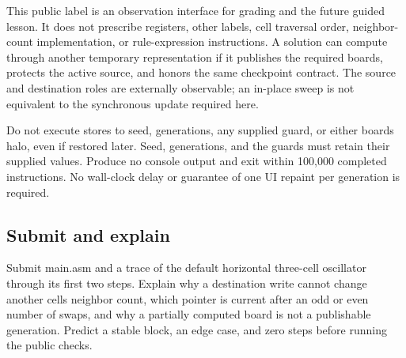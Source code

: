 This public label is an observation interface for grading and the future
guided lesson. It does not prescribe registers, other labels, cell
traversal order, neighbor-count implementation, or rule-expression
instructions. A solution can compute through another temporary
representation if it publishes the required boards, protects the active
source, and honors the same checkpoint contract. The source and
destination roles are externally observable; an in-place sweep is not
equivalent to the synchronous update required here.

Do not execute stores to seed, generations, any supplied guard, or
either board\textquotesingle s halo, even if restored later. Seed,
generations, and the guards must retain their supplied values. Produce
no console output and exit within 100,000 completed instructions. No
wall-clock delay or guarantee of one UI repaint per generation is
required.

\subsection{Submit and
  explain}\label{008-life-generations-assignment-submit-and-explain}

Submit main.asm and a trace of the default horizontal three-cell
oscillator through its first two steps. Explain why a destination write
cannot change another cell\textquotesingle s neighbor count, which
pointer is current after an odd or even number of swaps, and why a
partially computed board is not a publishable generation. Predict a
stable block, an edge case, and zero steps before running the public
checks.
